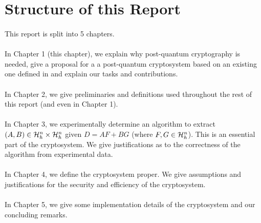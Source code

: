 \section{Structure of this Report}
\paragraph{}
This report is split into 5 chapters.

\paragraph{}
In Chapter 1 (this chapter), we explain why post-quantum cryptography is needed, give a proposal for a a post-quantum cryptosystem based on an existing one defined in \cite{aggarwal2018new} and explain our tasks and contributions.

\paragraph{}
In Chapter 2, we give preliminaries and definitions used throughout the rest of this report (and even in Chapter 1).

\paragraph{}
In Chapter 3, we experimentally determine an algorithm to extract $(A, B) \in \mathcal{H}_h^n \times \mathcal{H}_h^n$ given $D = AF + BG$ (where $F, G \in \mathcal{H}_h^n$). This is an essential part of the cryptosystem. We give justifications as to the correctness of the algorithm from experimental data.

\paragraph{}
In Chapter 4, we define the cryptosystem proper. We give assumptions and justifications for the security and efficiency of the cryptosystem.

\paragraph{}
In Chapter 5, we give some implementation details of the cryptosystem and our concluding remarks.